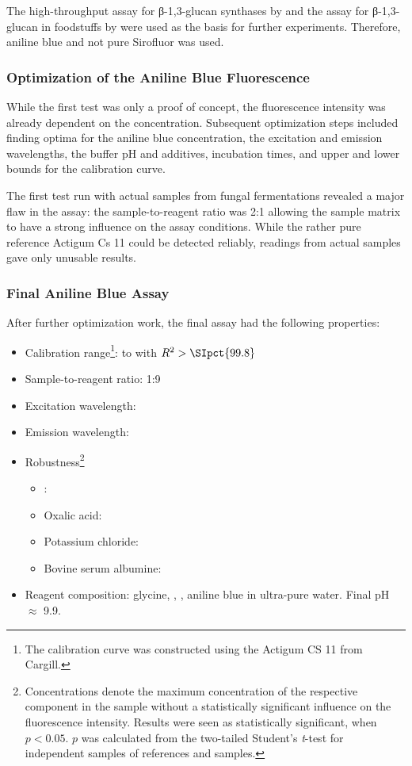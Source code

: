 The high-throughput assay for β-1,3-glucan synthases by \textcite{Shedletzky1997} and the assay for β-1,3-glucan in foodstuffs by \textcite{Ko2004} were used as the basis for further experiments. Therefore, aniline blue and not pure Sirofluor was used.

\subsubsection{Optimization of the Aniline Blue Fluorescence}
While the first test was only a proof of concept, the fluorescence intensity was already dependent on the \scl{} concentration. Subsequent optimization steps included finding optima for the aniline blue concentration, the excitation and emission wavelengths, the buffer pH and additives, incubation times, and upper and lower bounds for the calibration curve.

The first test run with actual samples from fungal fermentations revealed a major flaw in the assay: the sample-to-reagent ratio was 2:1 allowing the sample matrix to have a strong influence on the assay conditions. While the rather pure reference \scl{} Actigum Cs 11 could be detected reliably, readings from actual samples gave only unusable results.

\subsubsection{Final Aniline Blue Assay}
After further optimization work, the final assay \cite{Koenig2017} had the following properties:
\begin{itemize}
	\item Calibration range\footnote{The calibration curve was constructed using the \scl{} Actigum CS 11 from Cargill.}:  to  with $R^2 > \SIpct{99.8}$
	\item Sample-to-reagent ratio: 1:9
	\item Excitation wavelength: 
	\item Emission wavelength: 
	\item Robustness\footnote{Concentrations denote the maximum concentration of the respective component in the sample without a statistically significant influence on the fluorescence intensity. Results were seen as statistically significant, when $p < 0.05$. $p$ was calculated from the two-tailed Student's \textit{t}-test for independent samples of references and samples.}
		\begin{itemize}
			\item \GLC{}: 
			\item Oxalic acid: 
			\item Potassium chloride: 
			\item Bovine serum albumine: 
		\end{itemize}
	\item Reagent composition:  glycine,  ,  ,  aniline blue in ultra-pure water. Final pH $\approx$ 9.9.
\end{itemize}

